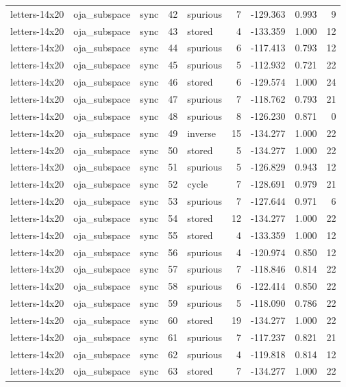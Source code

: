 \begin{tabular}{lllrlrrrr}
letters-14x20 & oja\_subspace & sync & 42 & spurious & 7 & -129.363 & 0.993 & 9 \\
letters-14x20 & oja\_subspace & sync & 43 & stored & 4 & -133.359 & 1.000 & 12 \\
letters-14x20 & oja\_subspace & sync & 44 & spurious & 6 & -117.413 & 0.793 & 12 \\
letters-14x20 & oja\_subspace & sync & 45 & spurious & 5 & -112.932 & 0.721 & 22 \\
letters-14x20 & oja\_subspace & sync & 46 & stored & 6 & -129.574 & 1.000 & 24 \\
letters-14x20 & oja\_subspace & sync & 47 & spurious & 7 & -118.762 & 0.793 & 21 \\
letters-14x20 & oja\_subspace & sync & 48 & spurious & 8 & -126.230 & 0.871 & 0 \\
letters-14x20 & oja\_subspace & sync & 49 & inverse & 15 & -134.277 & 1.000 & 22 \\
letters-14x20 & oja\_subspace & sync & 50 & stored & 5 & -134.277 & 1.000 & 22 \\
letters-14x20 & oja\_subspace & sync & 51 & spurious & 5 & -126.829 & 0.943 & 12 \\
letters-14x20 & oja\_subspace & sync & 52 & cycle & 7 & -128.691 & 0.979 & 21 \\
letters-14x20 & oja\_subspace & sync & 53 & spurious & 7 & -127.644 & 0.971 & 6 \\
letters-14x20 & oja\_subspace & sync & 54 & stored & 12 & -134.277 & 1.000 & 22 \\
letters-14x20 & oja\_subspace & sync & 55 & stored & 4 & -133.359 & 1.000 & 12 \\
letters-14x20 & oja\_subspace & sync & 56 & spurious & 4 & -120.974 & 0.850 & 12 \\
letters-14x20 & oja\_subspace & sync & 57 & spurious & 7 & -118.846 & 0.814 & 22 \\
letters-14x20 & oja\_subspace & sync & 58 & spurious & 6 & -122.414 & 0.850 & 22 \\
letters-14x20 & oja\_subspace & sync & 59 & spurious & 5 & -118.090 & 0.786 & 22 \\
letters-14x20 & oja\_subspace & sync & 60 & stored & 19 & -134.277 & 1.000 & 22 \\
letters-14x20 & oja\_subspace & sync & 61 & spurious & 7 & -117.237 & 0.821 & 21 \\
letters-14x20 & oja\_subspace & sync & 62 & spurious & 4 & -119.818 & 0.814 & 12 \\
letters-14x20 & oja\_subspace & sync & 63 & stored & 7 & -134.277 & 1.000 & 22 \\

\end{tabular}
